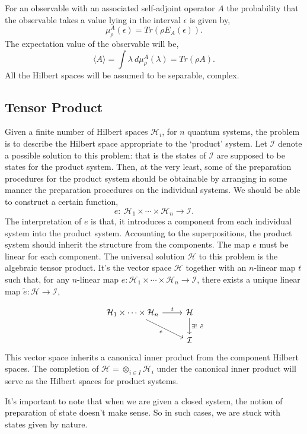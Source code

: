 \documentclass[11pt]{report}
\begin{document}
			For an observable with an associated self-adjoint operator $A$ the probability that the observable takes a value lying in the interval $\epsilon$ is given by, 
			$$\mu^A_\rho(\epsilon)=Tr(\rho E_A(\epsilon)).$$
			The expectation value of the observable will be,
			$$\langle A\rangle =\int \lambda\: d\mu^A_\rho(\lambda)=Tr(\rho A).$$
			All the Hilbert spaces will be assumed to be separable, complex. 
			\subsection{{Tensor Product}}
			Given a finite number of Hilbert spaces $\mathcal{H}_i$, for $n$ quantum systems, the problem is to describe the Hilbert space appropriate to the `product' system.
			Let $\mathcal{I}$ denote a possible solution to this problem: that is the states of $\mathcal{I}$ are supposed to be states for the product system. Then, at the very least, some of the preparation procedures for the product system should be obtainable by arranging in some manner the preparation procedures on the individual systems. We should be able to construct a certain function,
			$$e:\:\mathcal{H}_1\times\cdots\times \mathcal{H}_n \to \mathcal{I}.$$
			The interpretation of $e$ is that, it introduces a component from each individual system into the product system. Accounting to the superpositions, the product system should inherit the structure from the components. The map $e$ must be linear for each component. The universal solution $\mathcal{H}$ to this problem is the algebraic tensor product. It's the vector space $\mathcal{H}$ together with an $n$-linear map $t$ such that, for any $n$-linear map $e:\mathcal{H}_1\times\cdots\times \mathcal{H}_n\to\mathcal{I}$, there exists a unique linear map $\tilde{e}:\mathcal{H}\to\mathcal{I}$,
			
			\[ \begin{tikzcd}
				\mathcal{H}_1\times\cdots\times \mathcal{H}_n \arrow{r}{t} \arrow[swap]{rd}{e} & \mathcal{H} \arrow{d}{\exists !\:\:\tilde{e}} \\%
				&\mathcal{I}
			\end{tikzcd}
			\]
			This vector space inherits a canonical inner product from the component Hilbert spaces. The completion of $\mathcal{H}=\otimes_{i\in I}\mathcal{H}_i$ under the canonical inner product will serve as the Hilbert spaces for product systems.
			
			It's important to note that when we are given a closed system, the notion of preparation of state doesn't make sense. So in such cases, we are stuck with states given by nature.
			
\end{document}
